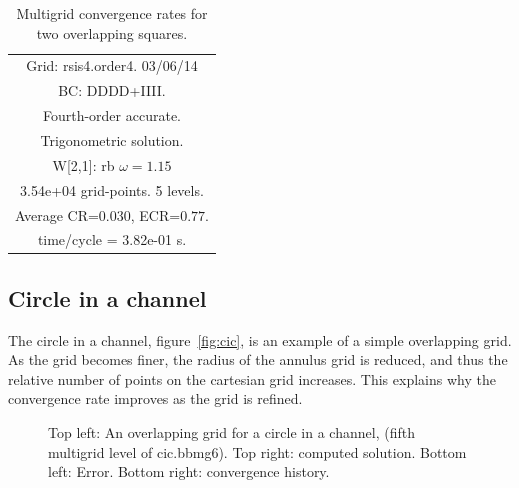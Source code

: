 \begin{table}[hbt]
\begin{center}
{\begin{tabular}{|c|c|c|c|c|}
\hline 
\multicolumn{5}{|c|}{Grid: rsis4.order4. 03/06/14}  \\
\multicolumn{5}{|c|}{BC: DDDD+IIII.}  \\
\multicolumn{5}{|c|}{Fourth-order accurate.}  \\
\multicolumn{5}{|c|}{Trigonometric solution.}  \\
\multicolumn{5}{|c|}{W[2,1]: rb $\omega=1.15$}  \\
\multicolumn{5}{|c|}{3.54e+04 grid-points. 5 levels.}  \\
\multicolumn{5}{|c|}{Average CR=$0.030$, ECR=$0.77$.}  \\
\multicolumn{5}{|c|}{time/cycle = 3.82e-01 s.}  \\
\hline 
\end{tabular}
} %
\end{center}
\caption{Multigrid convergence rates for two overlapping squares.}
\label{fig:smoothBox}
\end{table}

\clearpage
\subsection{Circle in a channel}

   The circle in a channel, figure~\ref{fig:cic}, is an example of a simple overlapping grid.
As the grid becomes finer, the radius of the annulus grid is reduced, and thus the relative
number of points on the cartesian grid increases. This explains why the convergence rate
improves as the grid is refined.

{
\newcommand{\figWidth}{7.cm}
\newcommand{\trimfig}[2]{\trimPlotb{#1}{#2}{.0}{.0}{.0}{.0}}
\begin{figure}[hbt]
\begin{center}
\end{center}
\caption{Top left: An overlapping grid for a circle in a channel, (fifth multigrid level of cic.bbmg6). 
Top right: computed solution. Bottom left: Error. Bottom right: convergence history.
} \label{fig:cic-conv}
\end{figure}
}



